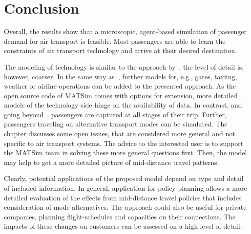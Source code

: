 \section{Conclusion}

Overall, the results show that a microscopic, agent-based simulation of passenger demand for air transport is feasible. 
Most passengers are able to learn the constraints of air transport technology and arrive at their desired destination.

The modeling of technology is similar to the approach by~\citet{ClarkeEtAl2007AirNetworkSim}, the level of detail is, however, coarser. 
In the same way as~\citet{ClarkeEtAl2007AirNetworkSim}, further models for, e.g., gates, taxiing, weather or airline operations can be added to the presented approach. 
As the open source code of MATSim comes with options for extension, more detailed models of the technology side hinge on the availability of data. 
In contrast, and going beyond~\citet{ClarkeEtAl2007AirNetworkSim}, passengers are captured at all stages of their trip. 
Further, passengers traveling on alternative transport modes can be simulated. 
The chapter discusses some open issues, that are considered more general and not specific to air transport systems. 
The advice to the interested user is to support the MATSim team in solving these more general questions first.  
Then, the model may help to get a more detailed picture of mid-distance travel patterns.

Clearly, potential applications of the proposed model depend on type and detail of included information. 
In general, application for policy planning allows a more detailed evaluation of the effects from mid-distance travel policies that includes consideration of mode alternatives. 
The approach could also be useful for private companies, planning flight-schedules and capacities on their connections. 
The impacts of these changes on customers can be assessed on a high level of detail. 

